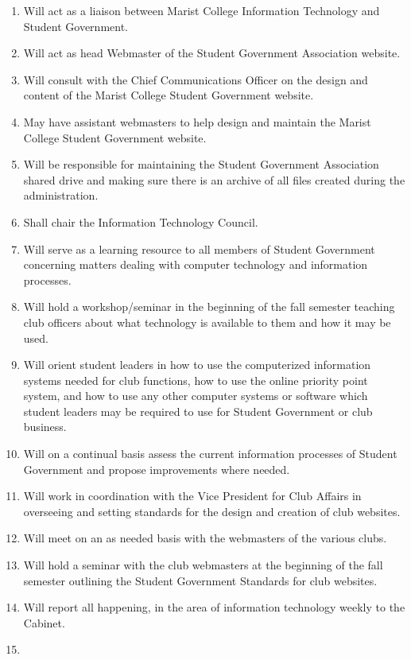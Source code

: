 \documentclass[11pt]{report}
\begin{document}
		\begin{enumerate}
			\item{Will act as a liaison between Marist College Information Technology and Student Government.}
			\item{Will act as head Webmaster of the Student Government Association website.}
			\item{Will consult with the Chief Communications Officer on the design and content of the Marist College Student Government website.}
			\item{May have assistant webmasters to help design and maintain the Marist College Student Government website.}
			\item{Will be responsible for maintaining the Student Government Association shared drive and making sure there is an archive of all files created during the administration.}
			\item{Shall chair the Information Technology Council.}
			\item{Will serve as a learning resource to all members of Student Government concerning matters dealing with computer technology and information processes.}
			\item{Will hold a workshop/seminar in the beginning of the fall semester teaching club officers about what technology is available to them and how it may be used.}
			\item{Will orient student leaders in how to use the computerized information systems needed for club functions, how to use the online priority point system, and how to use any other computer systems or software which student leaders may be required to use for Student Government or club business.}
			\item{Will on a continual basis assess the current information processes of Student Government and propose improvements where needed.}
			\item{Will work in coordination with the Vice President for Club Affairs in overseeing and setting standards for the design and creation of club websites.}
			\item{Will meet on an as needed basis with the webmasters of the various clubs.}
			\item{Will hold a seminar with the club webmasters at the beginning of the fall semester outlining the Student Government Standards for club websites.}
			\item{Will report all happening, in the area of information technology weekly to the Cabinet.}
			\item{
}
\end{enumerate}
\end{document}
